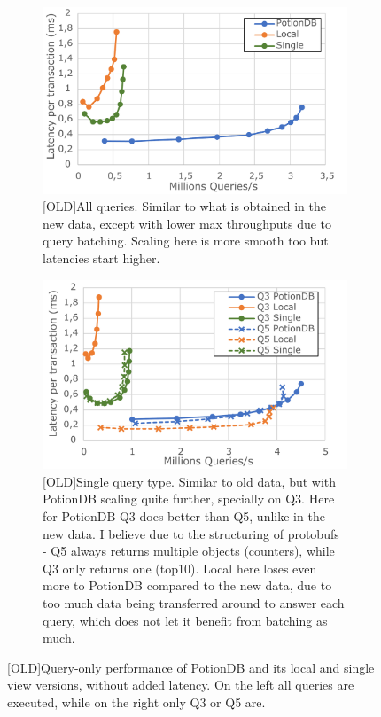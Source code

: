 \documentclass[sigplan,10pt]{acmart}
\begin{document}
\begin{figure}[h]
	\centering
	\begin{subfigure}{.47\linewidth}
		\centering
		\includegraphics[width=1\linewidth]{clientScale_cut}
		\caption{[OLD]All queries. Similar to what is obtained in the new data, except with lower max throughputs due to query batching. Scaling here is more smooth too but latencies start higher.}
		\label{fig:(old)global_local_single}
	\end{subfigure}%
	\hspace*{3em}
	\begin{subfigure}{.47\linewidth}
		\centering
		\includegraphics[width=.9\linewidth]{Q3vsQ5_cut}
		\caption{[OLD]Single query type. Similar to old data, but with PotionDB scaling quite further, specially on Q3. Here for PotionDB Q3 does better than Q5, unlike in the new data. I believe due to the structuring of protobufs - Q5 always returns multiple objects (counters), while Q3 only returns one (top10). Local here loses even more to PotionDB compared to the new data, due to too much data being transferred around to answer each query, which does not let it benefit from batching as much.}
		\label{fig:(old)q3q5}
	\end{subfigure}
	\caption{[OLD]Query-only performance of PotionDB and its local and single view versions, without added latency. On the left all queries are executed, while on the right only Q3 or Q5 are.}
	\label{fig:(new)query_only}
\end{figure}
\end{document}
